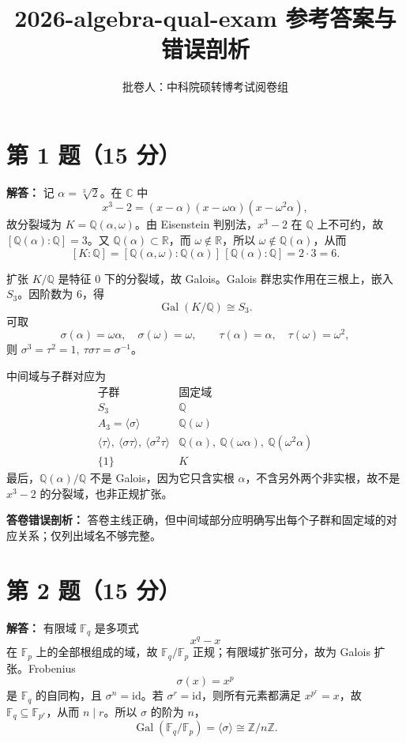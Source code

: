 \documentclass[11pt]{article}
\title{\textbf{2026-algebra-qual-exam 参考答案与错误剖析}}
\author{批卷人：中科院硕转博考试阅卷组}
\date{}
\begin{document}
\maketitle

\section*{第 1 题（15 分）}

\textbf{解答：}
记 \(\alpha=\sqrt[3]{2}\)。在 \(\mathbb C\) 中
\[
  x^3-2=(x-\alpha)(x-\omega\alpha)(x-\omega^2\alpha),
\]
故分裂域为 \(K=\mathbb Q(\alpha,\omega)\)。由 Eisenstein 判别法，\(x^3-2\) 在 \(\mathbb Q\) 上不可约，故 \([\mathbb Q(\alpha):\mathbb Q]=3\)。又 \(\mathbb Q(\alpha)\subset\mathbb R\)，而 \(\omega\notin\mathbb R\)，所以 \(\omega\notin\mathbb Q(\alpha)\)，从而
\[
  [K:\mathbb Q]=[\mathbb Q(\alpha,\omega):\mathbb Q(\alpha)]\,[\mathbb Q(\alpha):\mathbb Q]=2\cdot3=6.
\]

扩张 \(K/\mathbb Q\) 是特征 \(0\) 下的分裂域，故 Galois。Galois 群忠实作用在三根上，嵌入 \(S_3\)。因阶数为 \(6\)，得
\[
  \operatorname{Gal}(K/\mathbb Q)\cong S_3.
\]
可取
\[
  \sigma(\alpha)=\omega\alpha,\quad \sigma(\omega)=\omega,\qquad
  \tau(\alpha)=\alpha,\quad \tau(\omega)=\omega^2,
\]
则 \(\sigma^3=\tau^2=1,\ \tau\sigma\tau=\sigma^{-1}\)。

中间域与子群对应为
\[
\begin{array}{c|c}
\text{子群} & \text{固定域}\\
\hline
S_3 & \mathbb Q\\
A_3=\langle\sigma\rangle & \mathbb Q(\omega)\\
\langle\tau\rangle,\ \langle\sigma\tau\rangle,\ \langle\sigma^2\tau\rangle
& \mathbb Q(\alpha),\ \mathbb Q(\omega\alpha),\ \mathbb Q(\omega^2\alpha)\\
\{1\} & K
\end{array}
\]
最后，\(\mathbb Q(\alpha)/\mathbb Q\) 不是 Galois，因为它只含实根 \(\alpha\)，不含另外两个非实根，故不是 \(x^3-2\) 的分裂域，也非正规扩张。

\textbf{答卷错误剖析：}
答卷主线正确，但中间域部分应明确写出每个子群和固定域的对应关系；仅列出域名不够完整。

\section*{第 2 题（15 分）}

\textbf{解答：}
有限域 \(\mathbb F_q\) 是多项式
\[
  x^q-x
\]
在 \(\mathbb F_p\) 上的全部根组成的域，故 \(\mathbb F_q/\mathbb F_p\) 正规；有限域扩张可分，故为 Galois 扩张。Frobenius
\[
  \sigma(x)=x^p
\]
是 \(\mathbb F_q\) 的自同构，且 \(\sigma^n=\mathrm{id}\)。若 \(\sigma^r=\mathrm{id}\)，则所有元素都满足 \(x^{p^r}=x\)，故 \(\mathbb F_q\subseteq\mathbb F_{p^r}\)，从而 \(n\mid r\)。所以 \(\sigma\) 的阶为 \(n\)，
\[
  \operatorname{Gal}(\mathbb F_q/\mathbb F_p)=\langle\sigma\rangle\cong\mathbb Z/n\mathbb Z.
\]
\end{document}
